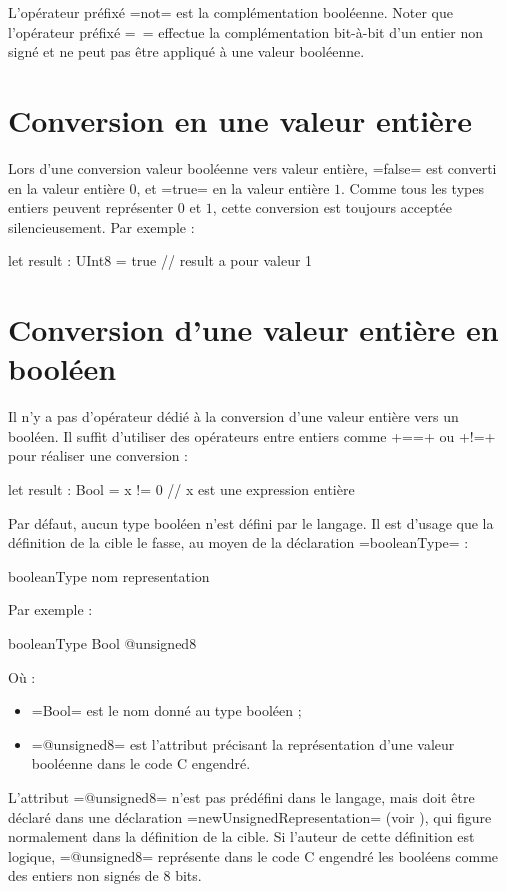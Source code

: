 L'opérateur préfixé \plm=not= est la complémentation booléenne. Noter que l'opérateur préfixé \plm=~= effectue la complémentation bit-à-bit d'un entier non signé et ne peut pas être appliqué à une valeur booléenne.

\section{Conversion en une valeur entière}

Lors d'une conversion valeur booléenne vers valeur entière, \plm=false= est converti en la valeur entière $0$, et \plm=true= en la valeur entière $1$. Comme tous les types entiers peuvent représenter $0$ et $1$, cette conversion est toujours acceptée silencieusement. Par exemple :

\begin{PLM}
let result : UInt8 = true // result a pour valeur 1
\end{PLM}


\section{Conversion d'une valeur entière en booléen}

Il n'y a pas d'opérateur dédié à la conversion d'une valeur entière vers un booléen. Il suffit d'utiliser des opérateurs entre entiers comme \plm+==+ ou \plm+!=+ pour réaliser une conversion :

\begin{PLM}
let result : Bool = x != 0 // x est une expression entière
\end{PLM}



Par défaut, aucun type booléen n'est défini par le langage. Il est d'usage que la définition de la cible le fasse, au moyen de la déclaration \plm=booleanType= :

\begin{PLM}
booleanType nom representation
\end{PLM}

Par exemple :
\begin{PLM}
booleanType Bool @unsigned8
\end{PLM}

Où :
\begin{itemize}
  \item \plm=Bool= est le nom donné au type booléen ;
  \item \plm=@unsigned8= est l'attribut précisant la représentation d'une valeur booléenne dans le code C engendré.
\end{itemize}

L'attribut \plm=@unsigned8= n'est pas prédéfini dans le langage, mais doit être déclaré dans une déclaration \plm=newUnsignedRepresentation= (voir ), qui figure normalement dans la définition de la cible. Si l'auteur de cette définition est logique, \plm=@unsigned8= représente dans le code C engendré les booléens comme des entiers non signés de 8 bits.

